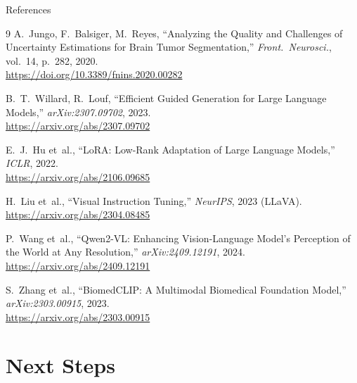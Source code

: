 \documentclass[aspectratio=169, 10pt]{beamer}
\begin{document}
\begin{frame}{References}
  \small
  \begin{thebibliography}{9}
    A.~Jungo, F.~Balsiger, M.~Reyes,
    ``Analyzing the Quality and Challenges of Uncertainty Estimations
    for Brain Tumor Segmentation,''
    \textit{Front.\ Neurosci.}, vol.~14, p.~282, 2020.\\
    \url{https://doi.org/10.3389/fnins.2020.00282}

    B.~T.~Willard, R.~Louf,
    ``Efficient Guided Generation for Large Language Models,''
    \textit{arXiv:2307.09702}, 2023.\\
    \url{https://arxiv.org/abs/2307.09702}

    E.~J.~Hu et~al.,
    ``LoRA: Low-Rank Adaptation of Large Language Models,''
    \textit{ICLR}, 2022.\\
    \url{https://arxiv.org/abs/2106.09685}

    H.~Liu et~al.,
    ``Visual Instruction Tuning,''
    \textit{NeurIPS}, 2023 (LLaVA).\\
    \url{https://arxiv.org/abs/2304.08485}

    P.~Wang et~al.,
    ``Qwen2-VL: Enhancing Vision-Language Model's Perception of the World
    at Any Resolution,''
    \textit{arXiv:2409.12191}, 2024.\\
    \url{https://arxiv.org/abs/2409.12191}

    S.~Zhang et~al.,
    ``BiomedCLIP: A Multimodal Biomedical Foundation Model,''
    \textit{arXiv:2303.00915}, 2023.\\
    \url{https://arxiv.org/abs/2303.00915}
  \end{thebibliography}
\end{frame}

\section{Next Steps}
\end{document}
